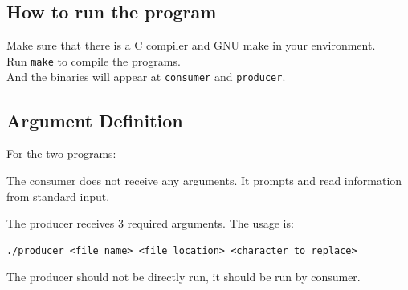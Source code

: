 \documentclass{article}
\begin{document}
\subsection{How to run the program}
Make sure that there is a C compiler and GNU make in your environment. \\
Run \texttt{make} to compile the programs. \\
And the binaries will appear at \texttt{consumer} and \texttt{producer}.

\subsection{Argument Definition}
For the two programs:

The consumer does not receive any arguments. It prompts and read information from standard input.

The producer receives 3 required arguments. The usage is:
\begin{verbatim}
./producer <file name> <file location> <character to replace>
\end{verbatim}

The producer should not be directly run, it should be run by consumer.
\end{document}
